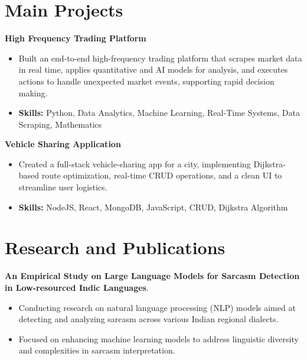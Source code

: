 \documentclass[a4paper,11pt]{article}
\begin{document}
\section{\textbf{Main Projects}}

\vspace{1mm}
  \textbf{High Frequency Trading Platform  }
\vspace{-1.5mm} %
\begin{itemize}
  \item Built an end-to-end high-frequency trading platform that scrapes market data in real time, applies quantitative and AI models for analysis, and executes actions to handle unexpected market events, supporting rapid decision making.
\vspace{-3mm}
  \item \textbf{Skills:} Python, Data Analytics, Machine Learning, Real-Time Systems, Data Scraping, Mathematics
\end{itemize}


\vspace{1mm}
   \textbf{Vehicle Sharing Application }
\vspace{-1.5mm} %
\begin{itemize}
  \item Created a full-stack vehicle-sharing app for a city, implementing Dijkstra-based route optimization, real-time CRUD operations, and a clean UI to streamline user logistics.
\vspace{-3mm}
  \item \textbf{Skills:} NodeJS, React, MongoDB, JavaScript, CRUD, Dijkstra Algorithm
\end{itemize}



\section{\textbf{Research and Publications} \hfill }
\vspace{1mm}
  \textbf{An Empirical Study on Large Language Models for Sarcasm Detection in Low-resourced Indic Languages}.
\vspace{-1mm} %
\begin{itemize}
  \item Conducting research on natural language processing (NLP) models aimed at detecting and analyzing sarcasm across various Indian regional dialects.
\vspace{-3mm}
  \item Focused on enhancing machine learning models to address linguistic diversity and complexities in sarcasm interpretation.
\end{itemize}
\end{document}
